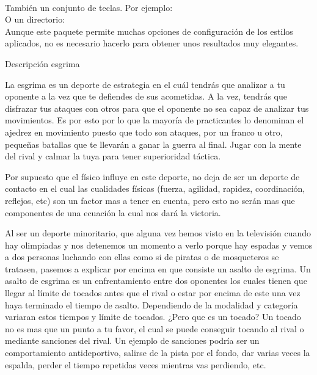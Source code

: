 \\

\noindent También un conjunto de teclas. Por ejemplo:
\\

\noindent O un directorio:
\\

\noindent Aunque este paquete permite muchas opciones de configuración de los estilos aplicados, no es necesario hacerlo para obtener unos resultados muy elegantes.
















Descripción esgrima

La esgrima es un deporte de estrategia en el cuál tendrás que analizar a tu
 oponente a la vez que te defiendes de sus acometidas. A la vez, tendrás que
 disfrazar tus ataques con otros para que el oponente no sea capaz de analizar
 tus movimientos. Es por esto por lo que la mayoría de practicantes lo denominan
 el ajedrez en movimiento puesto que todo son ataques, por un franco u otro,
 pequeñas batallas que te llevarán a ganar la guerra al final. Jugar con la mente
 del rival y calmar la tuya para tener superioridad táctica.

Por supuesto que el físico influye en este deporte, no deja de ser un deporte de contacto
 en el cual las cualidades físicas (fuerza, agilidad, rapidez, coordinación, reflejos, etc)
 son un factor mas a tener en cuenta, pero esto no serán mas que componentes de una ecuación
 la cual nos dará la victoria.

Al ser un deporte minoritario, que alguna vez hemos visto en la televisión cuando hay
 olimpiadas y nos detenemos un momento a verlo porque hay espadas y vemos a dos personas
 luchando con ellas como si de piratas o de mosqueteros se tratasen, pasemos a explicar por encima
 en que consiste un asalto de esgrima. Un asalto de esgrima es un enfrentamiento entre dos
 oponentes los cuales tienen que llegar al límite de tocados antes que el rival o estar por encima
 de este una vez haya terminado el tiempo de asalto. Dependiendo de la modalidad y categoría
 variaran estos tiempos y límite de tocados. ¿Pero que es un tocado? Un tocado no es mas que
 un punto a tu favor, el cual se puede conseguir tocando al rival o mediante sanciones del rival.
 Un ejemplo de sanciones podría ser un comportamiento antideportivo, salirse de la pista por el fondo,
 dar varias veces la espalda, perder el tiempo repetidas veces mientras vas perdiendo, etc.

